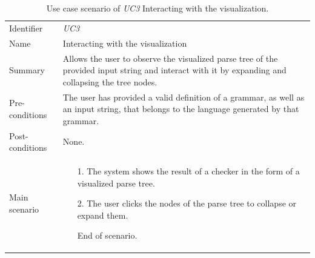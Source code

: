 \documentclass[english,bachelors,forcepolishlogotype]{wizthesis}
\begin{document}
\begin{xltabular}{\textwidth}{@{}L{3cm}X@{}}
  \caption{Use case scenario of \emph{UC3} Interacting with the visualization.}
  \label{tab:uc3-scenario}\\
  \toprule
  \endfirsthead
  \endhead
  \endfoot
  \endlastfoot
  Identifier & \emph{UC3} \\
  \addlinespace[0.5em] Name & Interacting with the visualization \\
  \addlinespace[0.5em] Summary & Allows the user to observe the visualized parse
  tree of the provided input string and interact with it by expanding and
  collapsing the tree nodes. \\
  \addlinespace[0.5em] Pre-conditions & The user has provided a valid definition
  of a grammar, as well as an input string, that belongs to the language
  generated by that grammar. \\
  \addlinespace[0.5em] Post-conditions & None. \\
  \addlinespace[0.5em] Main scenario &
  \begin{enumerate}[noitemsep,nolistsep,labelindent=0.5cm,align=right]
    \item [1.] The system shows the result of a checker in the form of a
    visualized parse tree.
    \item [2.] The user clicks the nodes of the parse tree to collapse or
    expand them.
    \item [] End of scenario.
  \end{enumerate} \\* \bottomrule
\end{xltabular}
\end{document}
